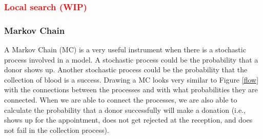 \documentclass[a4paper,12pt]{article}
\begin{document}
\subsubsection{\textcolor{red}{Local search (WIP)}}


\bigbreak
\subsubsection{Markov Chain}

A Markov Chain (MC) is a very useful instrument when there is a stochastic process involved in a model. A stochastic process could be the probability that a donor shows up. Another stochastic process could be the probability that the collection of blood is a success. Drawing a MC looks very similar to Figure \ref{flow} with the connections between the processes and with what probabilities they are connected. When we are able to connect the processes, we are also able to calculate the probability that a donor successfully will make a donation (i.e., shows up for the appointment, does not get rejected at the reception, and does not fail in the collection process).



\end{document}
